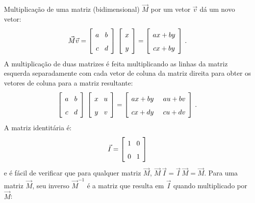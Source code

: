 Multiplicação de uma matriz (bidimensional) $\vec{M}$ por um vetor $\vec{v}$ dá um novo vetor:
\[
\spacearray
\vec{M}\vec{v}=\left[ \begin{array}{c} a\\c\end{array} \begin{array}{c} b\\d \end{array}\right]\, \left[ \begin{array}{c} x\\y\end{array}\right] = \left[ \begin{array}{c} ax+by\\cx+by\end{array}\right]\,.
\]
A multiplicação de duas matrizes é feita multiplicando as linhas da matriz esquerda separadamente com cada vetor de coluna da matriz direita para obter os vetores de coluna para a matriz resultante:
\[
\spacearray
\left[ \begin{array}{c} a\\c\end{array} \begin{array}{c} b\\d \end{array}\right]\, \left[ \begin{array}{c} x\\y\end{array} \begin{array}{c} u\\v\end{array}\right] = \left[ \begin{array}{c} ax+by\\cx+dy\end{array} \;\; \begin{array}{c} au+bv\\cu+dv\end{array}\right]\,.
\]
A matriz identitária é:
\[
\spacearray
\vec{I}=\left[\begin{array}{c} 1\\0\end{array} \begin{array}{c} 0\\1\end{array}\right]
\]
e é fácil de verificar que para qualquer matriz $\vec{M}$, $\vec{M}\, \vec{I} = \vec{I}\, \vec{M} = \vec{M}$.
Para uma matriz $\vec{M}$, seu inverso $\vec{M}^{-1}$ é a matriz que resulta em $\vec{I}$ quando multiplicado por $\vec{M}$:
